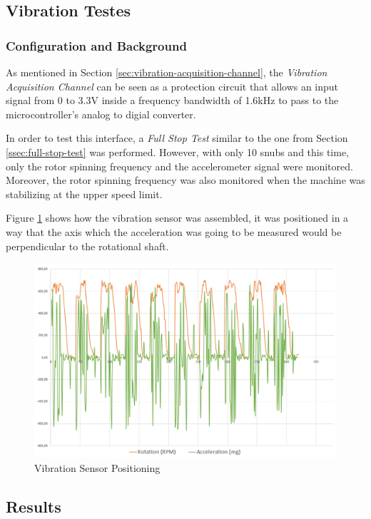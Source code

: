 \subsection{Vibration Testes}\label{ssec:vibrationTests}

	\subsubsection{Configuration and Background}

		As mentioned in Section \ref{sec:vibration-acquisition-channel}, the \textit{Vibration Acquisition Channel} can be seen as a protection circuit that allows an input signal from 0 to 3.3V inside a frequency bandwidth of 1.6kHz to pass to the microcontroller's analog to digial converter.
		\par
		In order to test this interface, a \textit{Full Stop Test} similar to the one from Section \ref{ssec:full-stop-test} was performed. However, with only 10 snubs and this time, only the rotor spinning frequency and the accelerometer signal were monitored. Moreover, the rotor spinning frequency was also monitored when the machine was stabilizing at the upper speed limit.

		Figure \ref{fig:test-vibration-assembly} shows how the vibration sensor was assembled, it was positioned in a way that the axis which the acceleration was going to be measured would be perpendicular to the rotational shaft.

		\begin{figure}[htbp]
			\centering
			\includegraphics[width=.9\textwidth]{figuras/fig-test-vibration-assembly}
			\caption{Vibration Sensor Positioning}
			\label{fig:test-vibration-assembly}
		\end{figure}

	\subsection{Results}	

